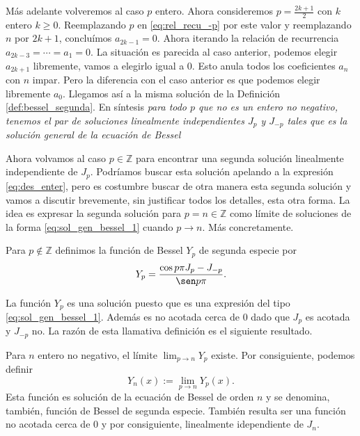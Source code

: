 Más adelante volveremos al caso $p$ entero. Ahora consideremos $p=\frac{2k+1}{2}$ con $k$ entero $k\geq 0$.  Reemplazando $p$ en \eqref{eq:rel_recu_-p}  por este valor y reemplazando $n$ por $2k+1$, concluímos $a_{2k-1}=0$. Ahora iterando la relación de recurrencia $a_{2k-3}=\cdots=a_1=0$. La situación es parecida al caso anterior, podemos elegir $a_{2k+1}$ libremente, vamos a elegirlo igual a $0$. Esto anula todos los coeficientes $a_n$ con $n$ impar. Pero la diferencia con el caso anterior es que podemos elegir libremente $a_0$. Llegamos así a la misma solución de la Definición \ref{def:bessel_segunda}. En síntesis \emph{para todo $p$ que no es un entero no negativo, tenemos el par de soluciones linealmente independientes $J_p$ y $J_{-p}$ tales que
es la solución general de la ecuación de Bessel}

Ahora volvamos al caso $p\in\mathbb{Z}$ para encontrar una segunda solución  linealmente independiente de $J_p$. Podríamos buscar esta solución apelando a la expresión \eqref{eq:des_enter}, pero es costumbre buscar de otra manera esta segunda solución y vamos a discutir brevemente,  sin justificar todos los detalles,  esta otra forma. La idea es expresar la segunda solución para  $p=n\in\mathbb{Z}$ como límite de soluciones  de la forma  \eqref{eq:sol_gen_bessel_1} cuando $p\to n$. Más concretamente.

\begin{definicion}{} Para $p\notin\mathbb{Z}$ definimos la función de Bessel $Y_p$ de segunda especie por
\begin{equation}\label{eq:bessel_2_especie}
Y_p=\frac{\cos p\pi J_p-J_{-p}}{\sen p\pi}.
\end{equation}
\end{definicion}

La función $Y_p$ es una solución puesto que es una expresión del tipo \eqref{eq:sol_gen_bessel_1}. Además es no acotada cerca de $0$ dado que $J_p$ es acotada y $J_{-p}$ no. La razón de esta llamativa definición es el siguiente resultado.

\begin{lema} Para $n$ entero no negativo,  el  límite $\lim_{p\to n}Y_p$ existe. Por consiguiente, podemos definir
\begin{equation}\label{eq:bessel_2_especie_b}
Y_n(x):=\lim_{p\to n}Y_p(x).
\end{equation}
Esta función es solución de la ecuación de Bessel de orden $n$ y se denomina, también, función de Bessel de segunda especie. También resulta ser una función no acotada cerca de $0$ y por consiguiente, linealmente idependiente de $J_n$.
\end{lema}






%
